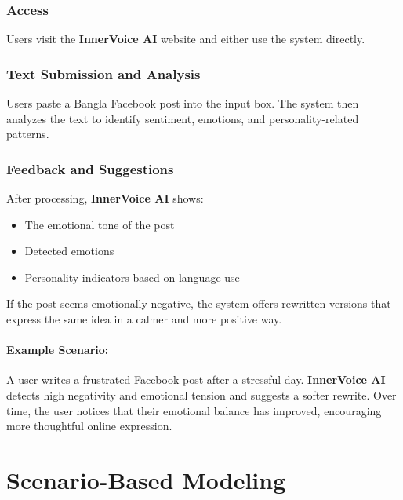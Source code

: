 \documentclass[12pt,a4paper]{report}
\begin{document}
\subsection{Access}

Users visit the \textbf{InnerVoice AI} website and either use the system directly.

\subsection{Text Submission and Analysis}

Users paste a Bangla Facebook post into the input box. The system then analyzes the text to identify sentiment, emotions, and personality-related patterns.

\subsection{Feedback and Suggestions}

After processing, \textbf{InnerVoice AI} shows:

\begin{itemize}
    \item The emotional tone of the post
    \item Detected emotions
    \item Personality indicators based on language use
\end{itemize}

If the post seems emotionally negative, the system offers rewritten versions that express the same idea in a calmer and more positive way.


\subsubsection{Example Scenario:}

A user writes a frustrated Facebook post after a stressful day. \textbf{InnerVoice AI} detects high negativity and emotional tension and suggests a softer rewrite. Over time, the user notices that their emotional balance has improved, encouraging more thoughtful online expression.

\chapter{Scenario-Based Modeling}
\end{document}

